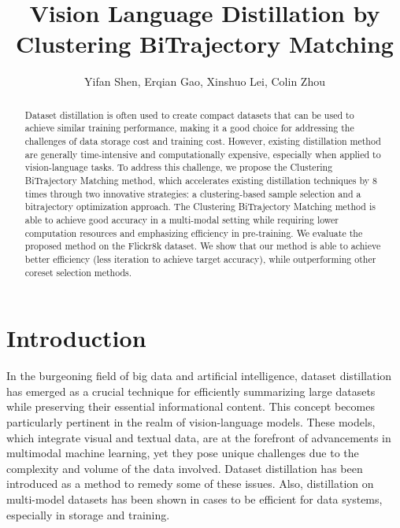 \documentclass[sigconf, nonacm]{acmart}
\begin{document}
\title{Vision Language Distillation by Clustering BiTrajectory Matching}

\author{Yifan Shen, Erqian Gao, Xinshuo Lei, Colin Zhou}


\begin{abstract}
Dataset distillation is often used to create compact datasets that can be used to achieve similar training performance, making it a good choice for addressing the challenges of data storage cost and training cost. However, existing distillation method are generally time-intensive and computationally expensive, especially when applied to vision-language tasks. To address this challenge, we propose the Clustering BiTrajectory Matching method, which accelerates existing distillation techniques by 8 times through two innovative strategies: a
clustering-based sample selection and a bitrajectory optimization
approach. The Clustering BiTrajectory Matching method is able to achieve good accuracy in a multi-modal setting while requiring lower computation resources and emphasizing efficiency in pre-training. We evaluate the proposed method on the Flickr8k dataset. We show that our method is able to achieve better efficiency (less iteration to achieve target accuracy), while outperforming other coreset selection methods.
\end{abstract}

\maketitle
\section{Introduction}
In the burgeoning field of big data and artificial intelligence, dataset distillation has emerged as a crucial technique for efficiently summarizing large datasets while preserving their essential informational content. This concept becomes particularly pertinent in the realm of vision-language models. These models, which integrate visual and textual data, are at the forefront of advancements in multimodal machine learning, yet they pose unique challenges due to the complexity and volume of the data involved. Dataset distillation has been introduced as a method to remedy some of these issues. Also, distillation on multi-model datasets has been shown in cases to be efficient for data systems, especially in storage and training.
\end{document}
